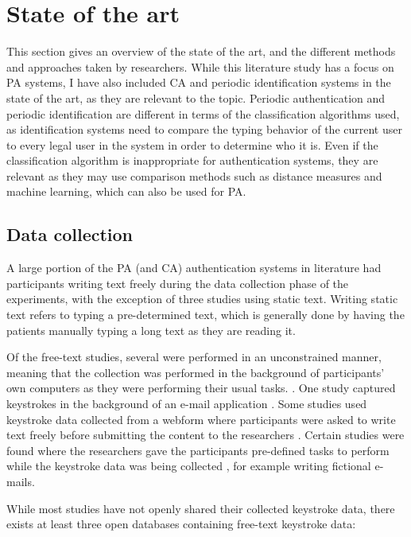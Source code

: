 \documentclass[informationsecurity]{gucmasterproject}
\begin{document}
\chapter{State of the art}
\label{chap:state}
This section gives an overview of the state of the art, and the different methods and approaches taken by researchers.
While this literature study has a focus on PA systems, I have also included CA \cite{BOURS201236, mondal} and periodic identification systems \cite{Solami, Janakiraman2007, Monrose} in the state of the art, as they are relevant to the topic.
Periodic authentication and periodic identification are different in terms of the classification algorithms used, as identification systems need to compare the typing behavior of the current user to every legal user in the system in order to determine who it is.
Even if the classification algorithm is inappropriate for authentication systems, they are relevant as they may use comparison methods such as distance measures and machine learning, which can also be used for PA.

\section{Data collection}
A large portion of the PA (and CA) authentication systems in literature had participants writing text freely during the data collection phase of the experiments, with the exception of three studies \cite{hu, KIM2017, sliding} using static text.
Writing static text refers to typing a pre-determined text, which is generally done by having the patients manually typing a long text as they are reading it.

Of the free-text studies, several were performed in an unconstrained manner, meaning that the collection was performed in the background of participants' own computers as they were performing their usual tasks. \cite{superResults, Pinto2014, Ahmed, Janakiraman2007, BOURS201236, mondal}.
One study captured keystrokes in the background of an e-mail application \cite{Messerman}.
Some studies used keystroke data collected from a webform where participants were asked to write text freely before submitting the content to the researchers \cite{gnp, davoudi2009, davoudi2010, Solami}.
Certain studies were found where the researchers gave the participants pre-defined tasks to perform while the keystroke data was being collected \cite{900words, Monrose, monaco, park}, for example writing fictional e-mails.

While most studies have not openly shared their collected keystroke data, there exists at least three open databases containing free-text keystroke data: 
\end{document}
